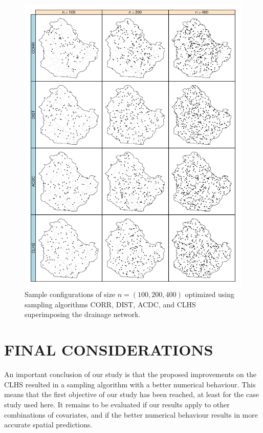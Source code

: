 \begin{figure}[!ht]
 \centering
 \includegraphics[width=\textwidth]{fig/chap07-points-corr-dist-acdc-clhs}
 \caption[Sample configurations optimized using four sampling algorithms.]{Sample configurations of size 
 $n = (100, 200, 400)$ optimized using sampling algorithms CORR, DIST,  ACDC, and CLHS superimposing the
 drainage network.}
 \label{fig:chap07-points}
\end{figure}

\section{FINAL CONSIDERATIONS}

An important conclusion of our study is that the proposed improvements on the CLHS resulted in a sampling 
algorithm with a better numerical behaviour. This means that the first objective of our study has been 
reached, at least for the case study used here. It remains to be evaluated if our results apply to other 
combinations of covariates, and if the better numerical behaviour results in more accurate spatial predictions.
